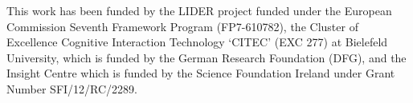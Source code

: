 \documentclass{acm_proc_article-sp}
\begin{document}
This work has been funded by the LIDER project funded under the European Commission 
Seventh Framework
Program (FP7-610782), 
the Cluster of Excellence Cognitive
Interaction Technology `CITEC' (EXC 277) at Bielefeld University, which
is funded by the German Research Foundation (DFG), and the Insight Centre which
is funded by the Science Foundation Ireland under Grant Number SFI/12/RC/2289.


 
%



\end{document}
